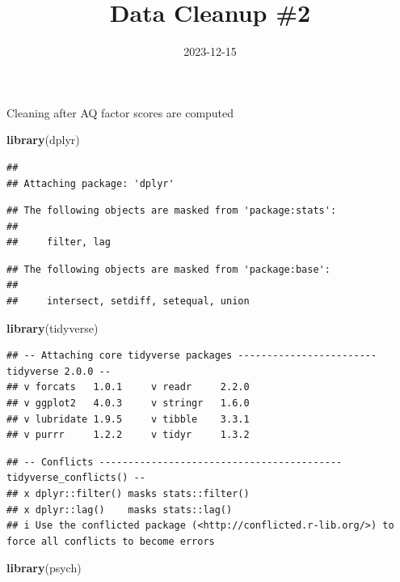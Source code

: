 \documentclass[
]{article}
\title{Data Cleanup \#2}
\author{}
\date{\vspace{-2.5em}2023-12-15}
\newenvironment{Shaded}{\begin{snugshade}}{\end{snugshade}}
\newcommand{\FunctionTok}[1]{\textcolor[rgb]{0.13,0.29,0.53}{\textbf{#1}}}
\newcommand{\NormalTok}[1]{#1}
\begin{document}
\maketitle

Cleaning after AQ factor scores are computed

\begin{Shaded}
\begin{Highlighting}[]
\FunctionTok{library}\NormalTok{(dplyr)}
\end{Highlighting}
\end{Shaded}

\begin{verbatim}
## 
## Attaching package: 'dplyr'
\end{verbatim}

\begin{verbatim}
## The following objects are masked from 'package:stats':
## 
##     filter, lag
\end{verbatim}

\begin{verbatim}
## The following objects are masked from 'package:base':
## 
##     intersect, setdiff, setequal, union
\end{verbatim}

\begin{Shaded}
\begin{Highlighting}[]
\FunctionTok{library}\NormalTok{(tidyverse)}
\end{Highlighting}
\end{Shaded}

\begin{verbatim}
## -- Attaching core tidyverse packages ------------------------ tidyverse 2.0.0 --
## v forcats   1.0.1     v readr     2.2.0
## v ggplot2   4.0.3     v stringr   1.6.0
## v lubridate 1.9.5     v tibble    3.3.1
## v purrr     1.2.2     v tidyr     1.3.2
\end{verbatim}

\begin{verbatim}
## -- Conflicts ------------------------------------------ tidyverse_conflicts() --
## x dplyr::filter() masks stats::filter()
## x dplyr::lag()    masks stats::lag()
## i Use the conflicted package (<http://conflicted.r-lib.org/>) to force all conflicts to become errors
\end{verbatim}

\begin{Shaded}
\begin{Highlighting}[]
\FunctionTok{library}\NormalTok{(psych)}
\end{Highlighting}
\end{Shaded}
\end{document}
